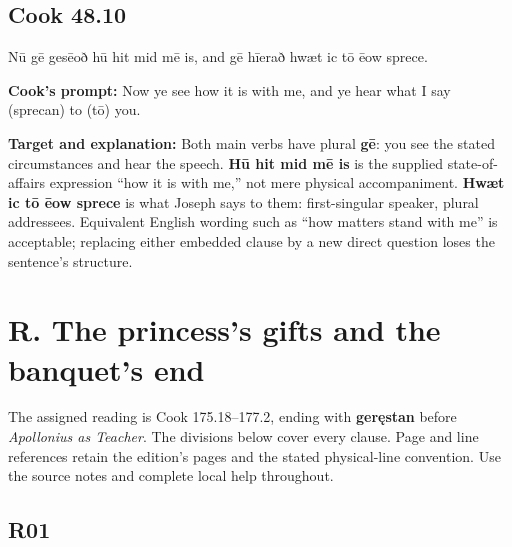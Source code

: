 \par\begin{minipage}{\linewidth}\raggedright
\subsection*{Cook 48.10}

Nū gē gesēoð hū hit mid mē is, and gē hīerað hwæt ic tō ēow sprece.

\textbf{Cook’s prompt:} Now ye see how it is with me, and ye hear what I say (sprecan) to (tō) you.

\textbf{Target and explanation:} Both main verbs have plural \textbf{gē}: you see the stated circumstances and hear the speech. \textbf{Hū hit mid mē is} is the supplied state-of-affairs expression “how it is with me,” not mere physical accompaniment. \textbf{Hwæt ic tō ēow sprece} is what Joseph says to them: first-singular speaker, plural addressees. Equivalent English wording such as “how matters stand with me” is acceptable; replacing either embedded clause by a new direct question loses the sentence’s structure.

\end{minipage}\par\addvspace{4pt}

\section*{R. The princess’s gifts and the banquet’s end}

The assigned reading is Cook 175.18–177.2, ending with \textbf{geręstan} before \emph{Apollonius as Teacher}. The divisions below cover every clause. Page and line references retain the edition’s pages and the stated physical-line convention. Use the source notes and complete local help throughout.

\subsection*{R01}

